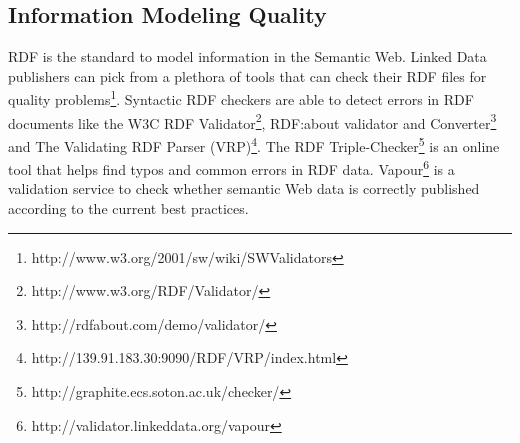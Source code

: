 \documentclass[onecolumn, crcready]{iosart2c}
\begin{document}
\subsection{Information Modeling Quality}
RDF is the standard to model information in the Semantic Web. Linked Data publishers can pick from a plethora of tools that can check their RDF files for quality problems\footnote{http://www.w3.org/2001/sw/wiki/SWValidators}. Syntactic RDF checkers are able to detect errors in RDF documents like the W3C RDF Validator\footnote{http://www.w3.org/RDF/Validator/}, RDF:about validator and Converter\footnote{http://rdfabout.com/demo/validator/} and The Validating RDF Parser (VRP)\footnote{http://139.91.183.30:9090/RDF/VRP/index.html}. The RDF Triple-Checker\footnote{http://graphite.ecs.soton.ac.uk/checker/} is an online tool that helps find typos and common errors in RDF data. Vapour\footnote{http://validator.linkeddata.org/vapour} \cite{Berrueta08cookinghttp} is a validation service to check whether semantic Web data is correctly published according to the current best practices\cite{tim:linkedata}.
\end{document}

